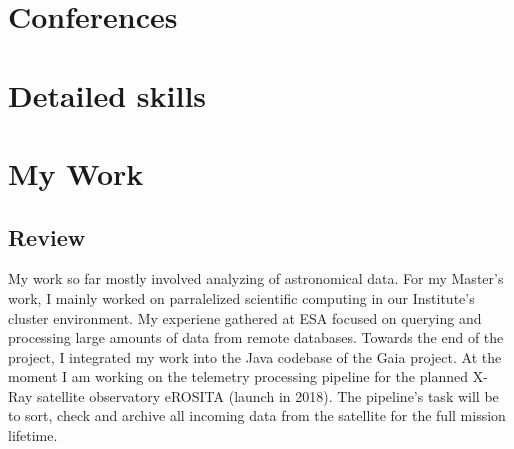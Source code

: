 \documentclass[letterpaper]{twentysecondcv} %
\begin{document}
\section{Conferences}

\begin{twentyshort} %
\end{twentyshort}



\section{Detailed skills}

\begin{twentyshort} %
\end{twentyshort}

\section{My Work}

\subsection{Review}

My work so far mostly involved analyzing of astronomical data. For my Master's work, I mainly worked on
parralelized scientific computing in our Institute's cluster environment. My experiene gathered at ESA
focused on querying and processing large amounts of data from remote databases. Towards the end of the
project, I integrated my work into the Java codebase of the Gaia project.
At the moment I am working on the telemetry processing pipeline for the planned X-Ray satellite observatory
eROSITA (launch in 2018). The pipeline's task will be to sort, check and archive all incoming data from the
satellite for the full mission lifetime.
\end{document}
